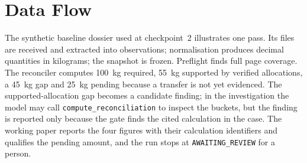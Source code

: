 \section{Data Flow}
The synthetic baseline dossier used at checkpoint~2 illustrates one pass. Its files are received
and extracted into observations; normalisation produces decimal quantities in kilograms; the
snapshot is frozen. Preflight finds full page coverage. The reconciler computes 100~kg required,
55~kg supported by verified allocations, a 45~kg gap and 25~kg pending because a transfer is not yet
evidenced. The supported-allocation gap becomes a candidate finding; in the investigation the
model may call \texttt{compute\_reconciliation} to inspect the buckets, but the finding is reported
only because the gate finds the cited calculation in the case. The working paper reports the four figures with their
calculation identifiers and qualifies the pending amount, and the run stops at
\texttt{AWAITING\_REVIEW} for a person.
